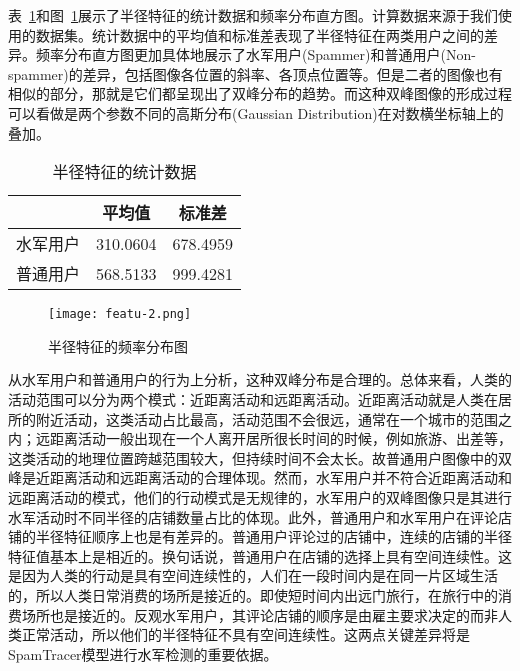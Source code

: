 表~\ref{tbl:radius}和图~\ref{fig:hist}展示了半径特征的统计数据和频率分布直方图。计算数据来源于我们使用的数据集。统计数据中的平均值和标准差表现了半径特征在两类用户之间的差异。频率分布直方图更加具体地展示了水军用户(Spammer)和普通用户(Non-spammer)的差异，包括图像各位置的斜率、各顶点位置等。但是二者的图像也有相似的部分，那就是它们都呈现出了双峰分布的趋势。而这种双峰图像的形成过程可以看做是两个参数不同的高斯分布(Gaussian Distribution)在对数横坐标轴上的叠加。

\begin{table}[htbp]
	\caption{半径特征的统计数据}
	\label{tbl:radius}
	\centering
	\begin{tabular}{ccc}
		\toprule
		& 平均值 & 标准差  \\
		\midrule
		水军用户      & 310.0604  & 678.4959  \\
		普通用户  & 568.5133  &	999.4281 \\
		\bottomrule
	\end{tabular}
\end{table}

\begin{figure}[htbp]
	\centering
	\begin{minipage}[htbp]{\textwidth}
		\centering
		\texttt{[image: featu-2.png]}
		\caption[半径特征的频率分布图]
		{半径特征的频率分布图\label{fig:hist}}		
	\end{minipage}     
\end{figure}

从水军用户和普通用户的行为上分析，这种双峰分布是合理的。总体来看，人类的活动范围可以分为两个模式：近距离活动和远距离活动。近距离活动就是人类在居所的附近活动，这类活动占比最高，活动范围不会很远，通常在一个城市的范围之内；远距离活动一般出现在一个人离开居所很长时间的时候，例如旅游、出差等，这类活动的地理位置跨越范围较大，但持续时间不会太长。故普通用户图像中的双峰是近距离活动和远距离活动的合理体现。然而，水军用户并不符合近距离活动和远距离活动的模式，他们的行动模式是无规律的，水军用户的双峰图像只是其进行水军活动时不同半径的店铺数量占比的体现。此外，普通用户和水军用户在评论店铺的半径特征顺序上也是有差异的。普通用户评论过的店铺中，连续的店铺的半径特征值基本上是相近的。换句话说，普通用户在店铺的选择上具有空间连续性。这是因为人类的行动是具有空间连续性的，人们在一段时间内是在同一片区域生活的，所以人类日常消费的场所是接近的。即使短时间内出远门旅行，在旅行中的消费场所也是接近的。反观水军用户，其评论店铺的顺序是由雇主要求决定的而非人类正常活动，所以他们的半径特征不具有空间连续性。这两点关键差异将是SpamTracer模型进行水军检测的重要依据。


